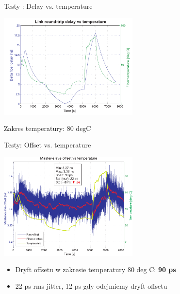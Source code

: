\documentclass[compress,red]{beamer}
\begin{document}
\begin{frame}{Testy : Delay vs. temperature}

  \begin{center}
  \includegraphics[width=7cm]{measurements/wrpc_delay_vs_temp.pdf}

  Zakres temperatury: 80 degC
  \end{center}

\end{frame}
\begin{frame}{Testy: Offset vs. temperature}

  \begin{center}
    \includegraphics[width=7cm]{measurements/wrpc_offset_vs_temp.pdf}
  \end{center}
  \begin{itemize}
    \item Dryft offsetu w zakresie temperatury 80 deg C: \textbf{90 ps}
    \item 22 ps rms jitter, 12 ps gdy odejmiemy dryft offsetu
  \end{itemize}

\end{frame}
\end{document}
